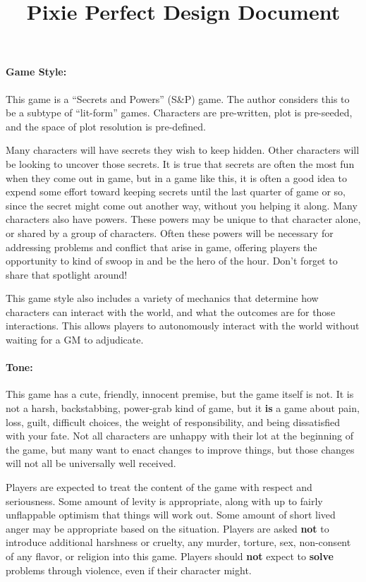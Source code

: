 \documentclass[sheet]{PP}
\begin{document}
{\centering \title{Pixie Perfect Design Document}}

\paragraph{Game Style:} This game is a “Secrets and Powers” (S\&P) game. The author considers this to be a subtype of “lit-form” games. Characters are pre-written, plot is pre-seeded, and the space of plot resolution is pre-defined. 

Many characters will have secrets they wish to keep hidden. Other characters will be looking to uncover those secrets. It is true that secrets are often the most fun when they come out in game, but in a game like this, it is often a good idea to expend some effort toward keeping secrets until the last quarter of game or so, since the secret might come out another way, without you helping it along. Many characters also have powers. These powers may be unique to that character alone, or shared by a group of characters. Often these powers will be necessary for addressing problems and conflict that arise in game, offering players the opportunity to kind of swoop in and be the hero of the hour. Don’t forget to share that spotlight around!

This game style also includes a variety of mechanics that determine how characters can interact with the world, and what the outcomes are for those interactions. This allows players to autonomously interact with the world without waiting for a GM to adjudicate.

\paragraph{Tone:} This game has a cute, friendly, innocent premise, but the game itself is not. It is not a harsh, backstabbing, power-grab kind of game, but it \textbf{is} a game about pain, loss, guilt, difficult choices, the weight of responsibility, and being dissatisfied with your fate. Not all characters are unhappy with their lot at the beginning of the game, but many want to enact changes to improve things, but those changes will not all be universally well received.

Players are expected to treat the content of the game with respect and seriousness. Some amount of levity is appropriate, along with up to fairly unflappable optimism that things will work out. Some amount of short lived anger may be appropriate based on the situation. Players are asked \textbf{not} to introduce additional harshness or cruelty, any murder, torture, sex, non-consent of any flavor, or religion into this game. Players should \textbf{not} expect to \textbf{solve} problems through violence, even if their character might.
\end{document}
